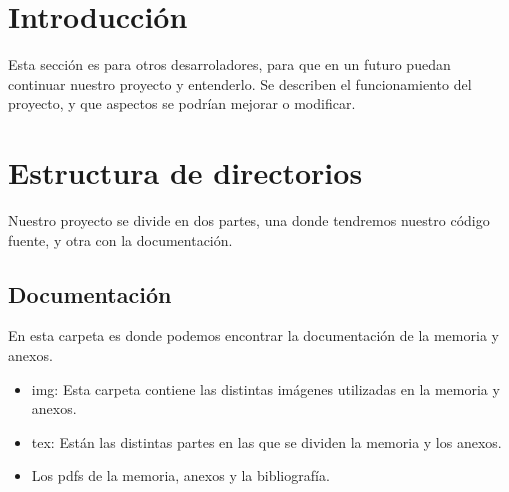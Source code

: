 
\section{Introducción}
Esta sección es para otros desarroladores, para que en un futuro puedan continuar nuestro proyecto y entenderlo. Se describen el funcionamiento del proyecto, y que aspectos se podrían mejorar o modificar.

\section{Estructura de directorios}
Nuestro proyecto se divide en dos partes, una donde tendremos nuestro código fuente, y otra con la documentación.

\subsection{Documentación}
En esta carpeta es donde podemos encontrar la documentación de la memoria y anexos.
\begin{itemize}
	\item img: Esta carpeta contiene las distintas imágenes utilizadas en la memoria y anexos.
	\item tex: Están las distintas partes en las que se dividen la memoria y los anexos.
	\item Los pdfs de la memoria, anexos y la bibliografía.
\end{itemize}

